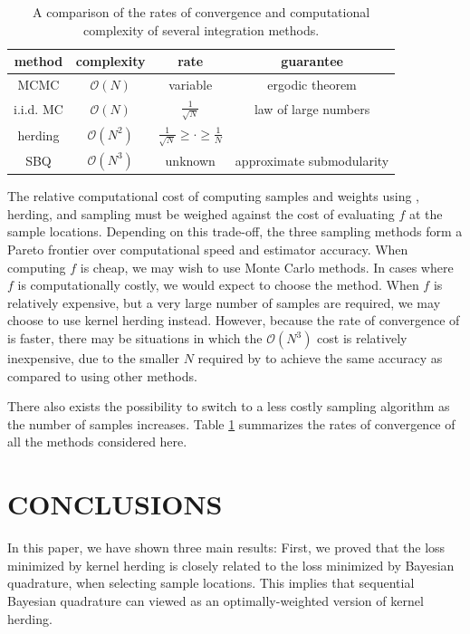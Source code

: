 \documentclass[]{article}
\begin{document}
%
\begin{table}[t]
\begin{center}
\begin{tabular}{c|ccc}
method & complexity & rate & guarantee\\
\midrule
MCMC & $\mathcal{O}(N)$ & variable & ergodic theorem\\
i.i.d. MC & $\mathcal{O}(N)$ & $\frac{1}{\sqrt{N}}$ & law of large numbers\\
herding & $\mathcal{O}(N^2)$ & $\frac{1}{\sqrt{N}} \geq \cdot \geq \frac{1}{N}$ & \citep{chen2010super,bach2012equivalence} \\
SBQ & $\mathcal{O}(N^3)$ & unknown & approximate submodularity\\
\end{tabular}
\end{center}
\caption{A comparison of the rates of convergence and computational complexity of several integration methods.}
\label{tbl:rates}
\end{table}
%


The relative computational cost of computing samples and weights using \bq{}, herding, and sampling must be weighed against the cost of evaluating $f$ at the sample locations.  Depending on this trade-off, the three sampling methods form a Pareto frontier over computational speed and estimator accuracy.  When computing $f$ is cheap, we may wish to use Monte Carlo methods.  In cases where $f$ is computationally costly, we would expect to choose the \sbq{} method.  When $f$ is relatively expensive, but a very large number of samples are required, we may choose to use kernel herding instead.  However, because the rate of convergence of \sbq{} is faster, there may be situations in which the $\mathcal{O}(N^3)$ cost is relatively inexpensive, due to the smaller $N$ required by \sbq{} to achieve the same accuracy as compared to using other methods.  

There also exists the possibility to switch to a less costly sampling algorithm as the number of samples increases.
Table \ref{tbl:rates} summarizes the rates of convergence of all the methods considered here.

\section{CONCLUSIONS}

In this paper, we have shown three main results:  First, we proved that the loss minimized by kernel herding is closely related to the loss minimized by Bayesian quadrature, when selecting sample locations. This implies that sequential Bayesian quadrature can viewed as an optimally-weighted version of kernel herding.
\end{document}
